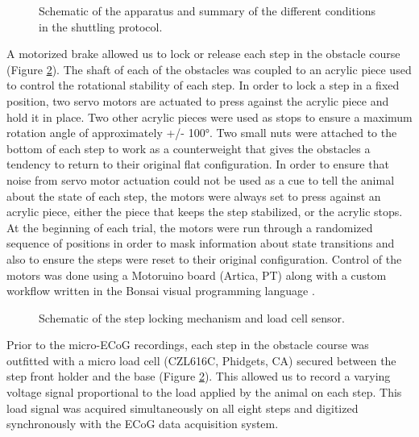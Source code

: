 \begin{figure}
\begin{center}

\end{center}
\vspace{-5mm}
\caption{Schematic of the apparatus and summary of the different conditions in the shuttling protocol.}
\label{fig:shuttlingProtocol}
\end{figure}

A motorized brake allowed us to lock or release each step in the obstacle course (Figure \ref{fig:shuttlingSteps}). The shaft of each of the obstacles was coupled to an acrylic piece used to control the rotational stability of each step. In order to lock a step in a fixed position, two servo motors are actuated to press against the acrylic piece and hold it in place. Two other acrylic pieces were used as stops to ensure a maximum rotation angle of approximately +/- \ang{100}. Two small nuts were attached to the bottom of each step to work as a counterweight that gives the obstacles a tendency to return to their original flat configuration. In order to ensure that noise from servo motor actuation could not be used as a cue to tell the animal about the state of each step, the motors were always set to press against an acrylic piece, either the piece that keeps the step stabilized, or the acrylic stops. At the beginning of each trial, the motors were run through a randomized sequence of positions in order to mask information about state transitions and also to ensure the steps were reset to their original configuration. Control of the motors was done using a Motoruino board (Artica, PT) along with a custom workflow written in the Bonsai visual programming language \cite{Lopes2015a}.

\begin{figure}
\begin{center}

\end{center}
\vspace{-5mm}
\caption{Schematic of the step locking mechanism and load cell sensor.}
\label{fig:shuttlingSteps}
\end{figure}

Prior to the micro-ECoG recordings, each step in the obstacle course was outfitted with a micro load cell (CZL616C, Phidgets, CA) secured between the step front holder and the base (Figure \ref{fig:shuttlingSteps}). This allowed us to record a varying voltage signal proportional to the load applied by the animal on each step. This load signal was acquired simultaneously on all eight steps and digitized synchronously with the ECoG data acquisition system.


